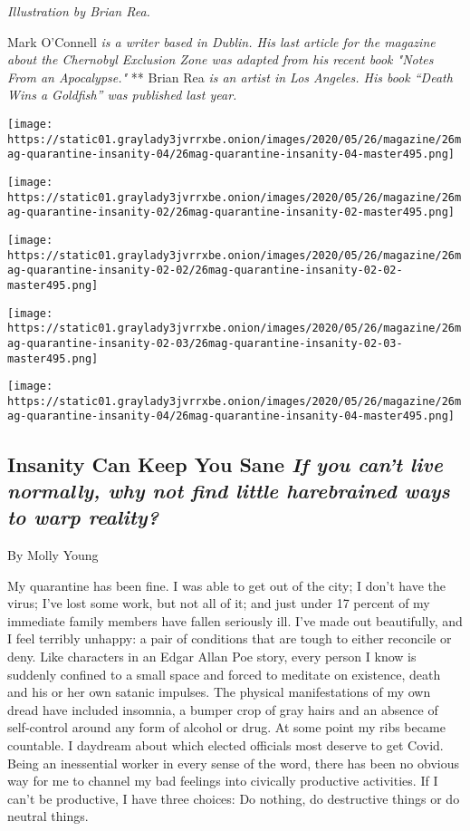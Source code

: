 \emph{Illustration by Brian Rea.}

Mark O'Connell \emph{is a writer based in Dublin. His last article for
the magazine about the Chernobyl Exclusion Zone was adapted from his
recent book "Notes From an Apocalypse."} ** Brian Rea \emph{is an artist
in Los Angeles. His book ``Death Wins a Goldfish'' was published last
year.}

\texttt{[image: https://static01.graylady3jvrrxbe.onion/images/2020/05/26/magazine/26mag-quarantine-insanity-04/26mag-quarantine-insanity-04-master495.png]}

\texttt{[image: https://static01.graylady3jvrrxbe.onion/images/2020/05/26/magazine/26mag-quarantine-insanity-02/26mag-quarantine-insanity-02-master495.png]}

\texttt{[image: https://static01.graylady3jvrrxbe.onion/images/2020/05/26/magazine/26mag-quarantine-insanity-02-02/26mag-quarantine-insanity-02-02-master495.png]}

\texttt{[image: https://static01.graylady3jvrrxbe.onion/images/2020/05/26/magazine/26mag-quarantine-insanity-02-03/26mag-quarantine-insanity-02-03-master495.png]}

\texttt{[image: https://static01.graylady3jvrrxbe.onion/images/2020/05/26/magazine/26mag-quarantine-insanity-04/26mag-quarantine-insanity-04-master495.png]}

\hypertarget{insanity-can-keep-you-sane-if-you-cant-live-normally-why-not-find-little-harebrained-ways-to-warp-reality}{%
\subsection{\texorpdfstring{Insanity Can Keep You Sane \emph{If you
can't live normally, why not find little harebrained ways to warp
reality?}}{Insanity Can Keep You Sane If you can't live normally, why not find little harebrained ways to warp reality?}}\label{insanity-can-keep-you-sane-if-you-cant-live-normally-why-not-find-little-harebrained-ways-to-warp-reality}}

By Molly Young

My quarantine has been fine. I was able to get out of the city; I don't
have the virus; I've lost some work, but not all of it; and just under
17 percent of my immediate family members have fallen seriously ill.
I've made out beautifully, and I feel terribly unhappy: a pair of
conditions that are tough to either reconcile or deny. Like characters
in an Edgar Allan Poe story, every person I know is suddenly confined to
a small space and forced to meditate on existence, death and his or her
own satanic impulses. The physical manifestations of my own dread have
included insomnia, a bumper crop of gray hairs and an absence of
self-control around any form of alcohol or drug. At some point my ribs
became countable. I daydream about which elected officials most deserve
to get Covid. Being an inessential worker in every sense of the word,
there has been no obvious way for me to channel my bad feelings into
civically productive activities. If I can't be productive, I have three
choices: Do nothing, do destructive things or do neutral things.


